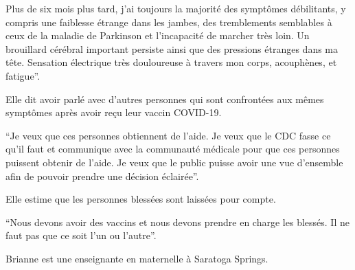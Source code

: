 {Plus de six mois plus tard, j'ai toujours la majorité des symptômes débilitants,
y compris une faiblesse étrange dans les jambes, des tremblements semblables à
ceux de la maladie de Parkinson et l'incapacité de marcher très loin. Un
brouillard cérébral important persiste ainsi que des pressions étranges dans ma
tête. Sensation électrique très douloureuse à travers mon corps, acouphènes, et
fatigue”.

Elle dit avoir parlé avec d'autres personnes qui sont confrontées aux mêmes
symptômes après avoir reçu leur vaccin COVID-19.

“Je veux que ces personnes obtiennent de l'aide. Je veux que le CDC fasse ce
qu'il faut et communique avec la communauté médicale pour que ces personnes
puissent obtenir de l'aide. Je veux que le public puisse avoir une vue
d'ensemble afin de pouvoir prendre une décision éclairée”.

Elle estime que les personnes blessées sont laissées pour compte.

“Nous devons avoir des vaccins et nous devons prendre en charge les blessés. Il
ne faut pas que ce soit l'un ou l'autre”.

Brianne est une enseignante en maternelle à Saratoga Springs.

}
